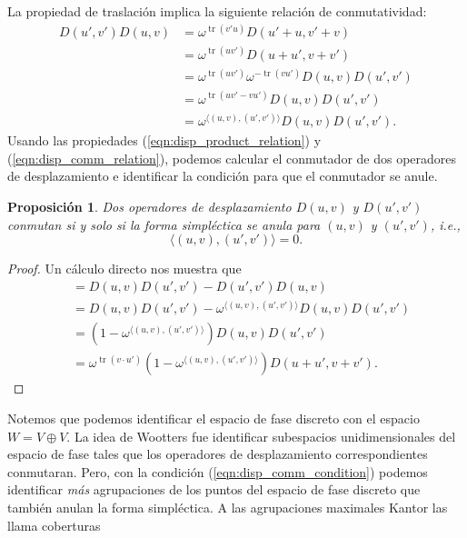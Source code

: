 \documentclass[a4paper]{report}
\DeclareMathOperator{\tr}{tr}
\newtheorem{proposition}{Proposición}
\begin{document}
  La propiedad de traslación implica la siguiente relación
  de conmutatividad:
  \begin{align}
    D(u',v')D(u,v)
    &= \omega^{\tr(v' u)} D(u'+u,v'+v) \\
    &= \omega^{\tr(u v')} D(u+u',v+v') \\
    &= \omega^{\tr(u v')} \omega^{-\tr(v u')}
    D(u,v)D(u',v') \\
    &= \omega^{\tr(u v' - v u')} D(u,v)D(u',v')
    \\
    &= \omega^{\langle (u,v), (u',v') \rangle}
    D(u,v)D(u',v') \label{eqn:disp_comm_relation}.
  \end{align}
  Usando las propiedades (\ref{eqn:disp_product_relation}) y
  (\ref{eqn:disp_comm_relation}), podemos calcular el
  conmutador de dos operadores de desplazamiento e
  identificar la condición para que el conmutador se anule.
  \begin{proposition}
    Dos operadores de desplazamiento $D(u,v)$ y $D(u',v')$
    conmutan si y solo si la forma simpléctica se anula para
    $(u,v)$ y $(u',v')$, i.e.,
    \begin{equation}
      \label{eqn:disp_comm_condition}
      \langle (u,v), (u',v') \rangle = 0.
    \end{equation}
  \end{proposition}
  \begin{proof}
    Un cálculo directo nos muestra que
    \begin{align}
      [D(u,v),D(u',v')]
      &= D(u,v)D(u',v') - D(u',v')D(u,v) \\
      &= D(u,v)D(u',v') - \omega^{\langle (u,v),(u',v')
      \rangle} D(u,v) D(u',v') \\
      &= \left( 1 - \omega^{\langle (u,v),(u',v') \rangle}
      \right) D(u,v)D(u',v') \\
      &= \omega^{\tr(v \cdot u')} \left( 1 - \omega^{\langle
      (u,v),(u',v') \rangle} \right) D(u+u',v+v').
      \label{eqn:disp_comm}
    \end{align}
  \end{proof}
  Notemos que podemos identificar el espacio de fase
  discreto con el espacio $W = V \oplus V$. La idea de
  Wootters fue identificar subespacios unidimensionales del
  espacio de fase tales que los operadores de desplazamiento
  correspondientes conmutaran. Pero, con la condición
  (\ref{eqn:disp_comm_condition}) podemos identificar
  \textit{más} agrupaciones de los puntos del espacio de
  fase discreto que también anulan la forma simpléctica. A
  las agrupaciones maximales Kantor las llama coberturas
\end{document}
